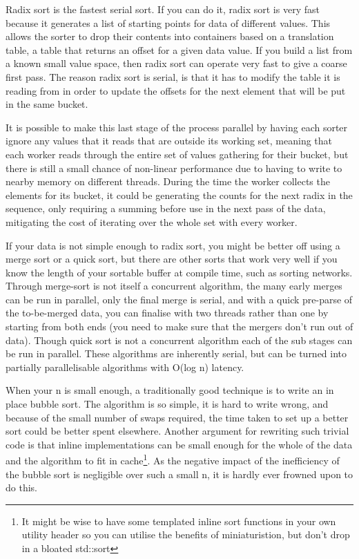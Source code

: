 Radix sort is the fastest serial sort. If you can do it, radix sort is very
fast because it generates a list of starting points for data of different
values. This allows the sorter to drop their contents into containers based on
a translation table, a table that returns an offset for a given data value. If
you build a list from a known small value space, then radix sort can operate
very fast to give a coarse first pass. The reason radix sort is serial, is that
it has to modify the table it is reading from in order to update the offsets
for the next element that will be put in the same bucket.

It is possible to make this last stage of the process parallel by having each
sorter ignore any values that it reads that are outside its working set,
meaning that each worker reads through the entire set of values gathering for
their bucket, but there is still a small chance of non-linear performance
due to having to write to nearby memory on different threads.  During
the time the worker collects the elements for its bucket, it could be
generating the counts for the next radix in the sequence, only requiring a
summing before use in the next pass of the data, mitigating the cost of
iterating over the whole set with every worker.

If your data is not simple enough to radix sort, you might be better off using
a merge sort or a quick sort, but there are other sorts that work very well if
you know the length of your sortable buffer at compile time, such as sorting
networks. Through merge-sort is not itself a concurrent algorithm, the many
early merges can be run in parallel, only the final merge is serial, and with a
quick pre-parse of the to-be-merged data, you can finalise with two threads
rather than one by starting from both ends (you need to make sure that the
mergers don't run out of data). Though quick sort is not a concurrent algorithm
each of the sub stages can be run in parallel.  These algorithms are inherently
serial, but can be turned into partially parallelisable algorithms with O(log
n) latency.

When your n is small enough, a traditionally good technique is to write an in
place bubble sort. The algorithm is so simple, it is hard to write wrong, and
because of the small number of swaps required, the time taken to set up a
better sort could be better spent elsewhere. Another argument for rewriting
such trivial code is that inline implementations can be small enough for the
whole of the data and the algorithm to fit in cache\footnote{It might be wise
to have some templated inline sort functions in your own utility header so you
can utilise the benefits of miniaturistion, but don't drop in a bloated
std::sort}.  As the negative impact of the inefficiency of the bubble sort is
negligible over such a small n, it is hardly ever frowned upon to do this.

